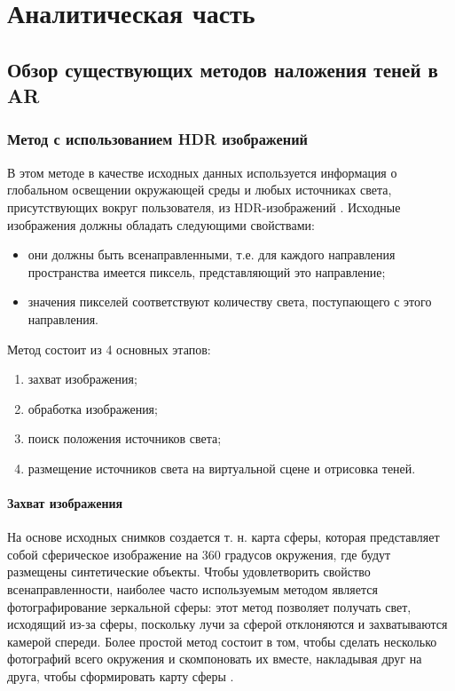 \chapter{Аналитическая часть}


\section{Обзор существующих методов наложения теней в AR}

\subsection{Метод с использованием HDR изображений}

В этом методе в качестве исходных данных используется информация о глобальном освещении окружающей среды и любых источниках света, присутствующих вокруг пользователя, из HDR-изображений \cite{hdri, rtsm}. Исходные изображения должны обладать следующими свойствами:

\begin{itemize}
	\item они должны быть всенаправленными, т.е. для каждого направления пространства имеется пиксель, представляющий это направление;
	\item значения пикселей соответствуют количеству света, поступающего с этого направления.
\end{itemize}

Метод состоит из 4 основных этапов:

\begin{enumerate}
	\item захват изображения;
	\item обработка изображения;
	\item поиск положения источников света;
	\item размещение источников света на виртуальной сцене и отрисовка теней.
\end{enumerate}

\subsubsection*{Захват изображения}

На основе исходных снимков создается т. н. карта сферы, которая представляет собой сферическое изображение на 360 градусов окружения, где будут размещены синтетические объекты. Чтобы удовлетворить свойство всенаправленности, наиболее часто используемым методом является фотографирование зеркальной сферы: этот метод позволяет получать свет, исходящий из-за сферы, поскольку лучи за сферой отклоняются и захватываются камерой спереди. Более простой метод состоит в том, чтобы сделать несколько фотографий всего окружения и скомпоновать их вместе, накладывая друг на друга, чтобы сформировать карту сферы \cite{rtsm}.

